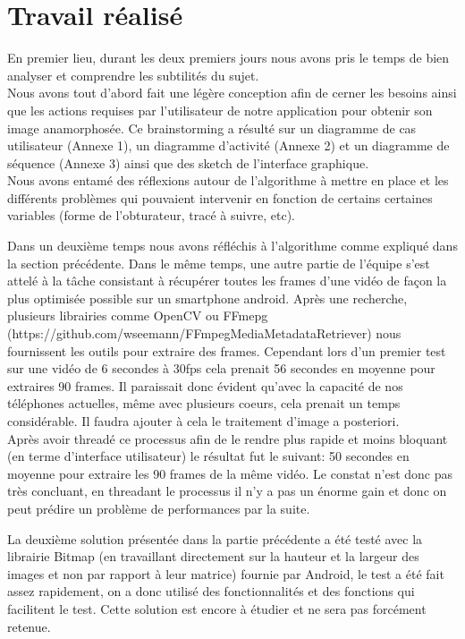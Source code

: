 \documentclass[a4paper,12pt]{report}
\begin{document}
\chapter{Travail réalisé}
En premier lieu, durant les deux premiers jours nous avons pris le temps de bien analyser et comprendre les subtilités du sujet. 
\\Nous avons tout d’abord fait une légère conception afin de cerner les besoins ainsi que les actions requises par l’utilisateur de notre application pour obtenir son image anamorphosée.
Ce brainstorming a résulté sur un diagramme de cas utilisateur (Annexe 1), un diagramme d’activité (Annexe 2) et un diagramme de séquence (Annexe 3) ainsi que des sketch de l’interface graphique.
\\Nous avons entamé des réflexions autour de l’algorithme à mettre en place et les différents problèmes qui pouvaient intervenir en fonction de certains certaines variables (forme de l’obturateur, tracé à suivre, etc).\bigskip

Dans un deuxième temps nous avons réfléchis à l’algorithme comme expliqué dans la section précédente.
Dans le même temps, une autre partie de l’équipe s’est attelé à la tâche consistant à récupérer toutes les frames d’une vidéo de façon la plus optimisée possible sur un smartphone android.
Après une recherche, plusieurs librairies comme OpenCV ou FFmepg  (https://github.com/wseemann/FFmpegMediaMetadataRetriever) nous fournissent les outils pour extraire des frames.
Cependant lors d’un premier test sur une vidéo de 6 secondes à 30fps cela prenait 56 secondes en moyenne pour extraires 90 frames.
Il paraissait donc évident qu’avec la capacité de nos téléphones actuelles, même avec plusieurs coeurs, cela prenait un temps considérable.
Il faudra ajouter à cela le traitement d’image a posteriori.
\\Après avoir threadé ce processus afin de le rendre plus rapide et moins bloquant (en terme d’interface utilisateur) le résultat fut le suivant: 50 secondes en moyenne pour extraire les 90 frames de la même vidéo.  Le constat n’est donc pas très concluant, en threadant le processus il n’y a pas un énorme gain et donc on peut prédire un problème de performances par la suite.

\newpage
La deuxième solution présentée dans la partie précédente a été testé avec la librairie Bitmap (en travaillant directement sur la hauteur et la largeur des images et non par rapport à leur matrice) fournie par Android,
le test a été fait assez rapidement, on a donc utilisé des fonctionnalités et des fonctions qui facilitent le test.
Cette solution est encore à étudier et ne sera pas forcément retenue.
\end{document}
